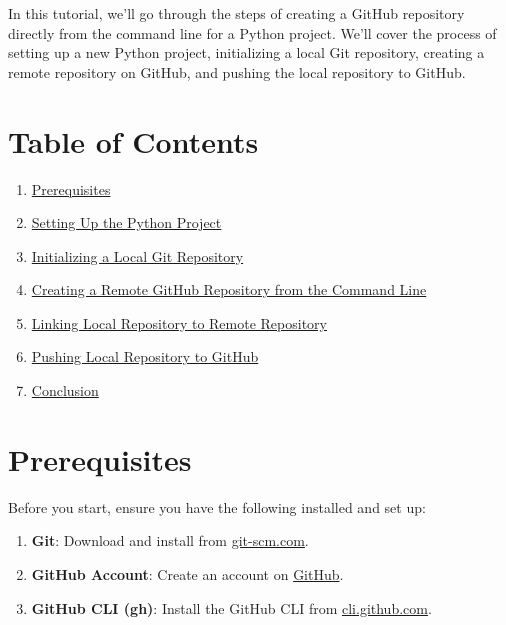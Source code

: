 \documentclass[
  letterpaper,
  DIV=11,
  numbers=noendperiod]{scrreprt}
\providecommand{\tightlist}{%
  \setlength{\itemsep}{0pt}\setlength{\parskip}{0pt}}\usepackage{longtable,booktabs,array}
\begin{document}
In this tutorial, we'll go through the steps of creating a GitHub
repository directly from the command line for a Python project. We'll
cover the process of setting up a new Python project, initializing a
local Git repository, creating a remote repository on GitHub, and
pushing the local repository to GitHub.

\section{Table of Contents}\label{table-of-contents-26}

\begin{enumerate}
\def\labelenumi{\arabic{enumi}.}
\tightlist
\item
  \hyperref[prerequisites]{Prerequisites}
\item
  \hyperref[setting-up-the-python-project]{Setting Up the Python
  Project}
\item
  \hyperref[initializing-a-local-git-repository]{Initializing a Local
  Git Repository}
\item
  \hyperref[creating-a-remote-github-repository-from-the-command-line]{Creating
  a Remote GitHub Repository from the Command Line}
\item
  \hyperref[linking-local-repository-to-remote-repository]{Linking Local
  Repository to Remote Repository}
\item
  \hyperref[pushing-local-repository-to-github]{Pushing Local Repository
  to GitHub}
\item
  \hyperref[conclusion]{Conclusion}
\end{enumerate}

\section{Prerequisites}\label{prerequisites-2}

Before you start, ensure you have the following installed and set up:

\begin{enumerate}
\def\labelenumi{\arabic{enumi}.}
\tightlist
\item
  \textbf{Git}: Download and install from
  \href{https://git-scm.com/}{git-scm.com}.
\item
  \textbf{GitHub Account}: Create an account on
  \href{https://github.com/}{GitHub}.
\item
  \textbf{GitHub CLI (gh)}: Install the GitHub CLI from
  \href{https://cli.github.com/}{cli.github.com}.
\end{enumerate}
\end{document}
